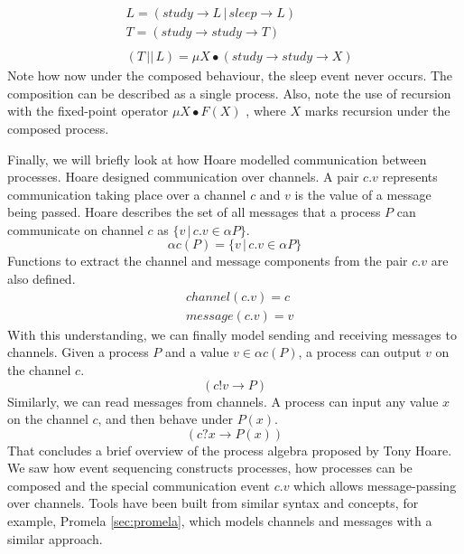 \[
\begin{aligned}
& L = (study \rightarrow L \,|\, sleep \rightarrow L) \\
& T = (study \rightarrow study \rightarrow T) \\
& \\ 
& (T \,||\, L) = \mu X \bullet (study \rightarrow study \rightarrow X)
\end{aligned}
\]
Note how now under the composed behaviour, the sleep event never occurs. The composition can be described as a single process. Also, note the use of recursion with the fixed-point operator $\mu X \bullet F(X)$ \cite[p.74]{csp_paper}, where $X$ marks recursion under the composed process.
\par
Finally, we will briefly look at how Hoare modelled communication between processes. Hoare designed communication over channels. A pair $c.v$ represents communication taking place over a channel $c$ and $v$ is the value of a message being passed. Hoare describes the set of all messages that a process $P$ can communicate on channel $c$ as $\{ v \,|\, c.v \in \alpha P \}.$
\[
\alpha c(P) = \{ v \,|\, c.v \in \alpha P \}
\]
Functions to extract the channel and message components from the pair $c.v$ are also defined.
\[
\begin{aligned}
& channel(c.v) = c \\
& message(c.v) = v
\end{aligned}
\]
With this understanding, we can finally model sending and receiving messages to channels. Given a process $P$ and a value $v \in \alpha c(P)$, a process can output $v$ on the channel $c$.
\[
(c!v \rightarrow P)
\]
Similarly, we can read messages from channels. A process can input any value $x$ on the channel $c$, and then behave under $P(x)$.
\[
(c?x \rightarrow P(x))
\]
That concludes a brief overview of the process algebra proposed by Tony Hoare. We saw how event sequencing constructs processes, how processes can be composed and the special communication event $c.v$ which allows message-passing over channels. Tools have been built from similar syntax and concepts, for example, Promela \ref{sec:promela}, which models channels and messages with a similar approach.
